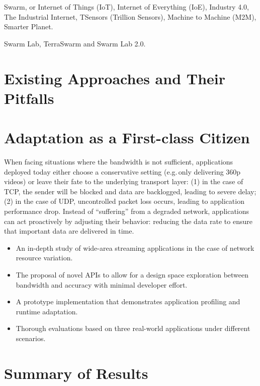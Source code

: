 \documentclass[thesis.tex]{subfiles}
\begin{document}
Swarm, or Internet of Things (IoT), Internet of Everything (IoE), Industry 4.0,
The Industrial Internet, TSensors (Trillion Sensors), Machine to Machine (M2M),
Smarter Planet.

Swarm Lab, TerraSwarm and Swarm Lab 2.0.

\section{Existing Approaches and Their Pitfalls}
\label{sec:exist-appr-their}



\section{Adaptation as a First-class Citizen}
\label{sec:adaptation}

When facing situations where the bandwidth is not sufficient, applications
deployed today either choose a conservative setting (e.g.\,only delivering 360p
videos) or leave their fate to the underlying transport layer: (1) in the case
of TCP, the sender will be blocked and data are backlogged, leading to severe
delay; (2) in the case of UDP, uncontrolled packet loss occurs, leading to
application performance drop. Instead of ``suffering'' from a degraded network,
applications can act proactively by adjusting their behavior: reducing the data
rate to ensure that important data are delivered in time.

\begin{itemize}
\item An in-depth study of wide-area streaming applications in the case of
  network resource variation.
\item The proposal of novel APIs to allow for a design space exploration between
  bandwidth and accuracy with minimal developer effort.
\item A prototype implementation that demonstrates application profiling and
  runtime adaptation.
\item Thorough evaluations based on three real-world applications under
  different scenarios.
\end{itemize}


\section{Summary of Results}
\label{sec:summary-results}
\end{document}
